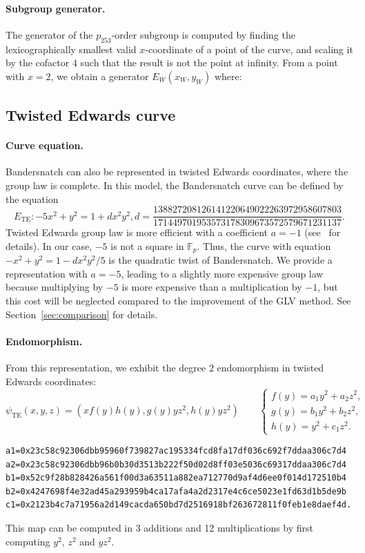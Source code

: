 \documentclass{article}
\newcommand{\Fp}{\ensuremath{\mathbb F_p}}
\theoremstyle{definition}
\begin{document}
\paragraph{Subgroup generator.}
The generator of the $p_{253}$-order subgroup is computed by finding the
lexicographically smallest valid $x$-coordinate of a point of the
curve, and scaling it by the cofactor $4$ such that the result is not
the point at infinity. From a point with $x=2$, we obtain a generator $E_W(x_W,y_W)$ where:


\subsection{Twisted Edwards curve}
\paragraph{Curve equation.}
Bandersnatch can also be represented in twisted Edwards coordinates,
where the group law is complete.
In this model, the Bandersnatch curve can be defined by the equation
$$E_\text{TE}:-5x^2+y^2 = 1 +
dx^2y^2, d=\frac{138827208126141220649022263972958607803}{171449701953573178309673572579671231137}.$$
Twisted Edwards group law is more efficient with a coefficient
$a = -1$ (see~\cite{AC:HWCD08} for details).
In our case, $-5$ is not a square in $\Fp$. Thus, the curve with
equation $-x^2+y^2 = 1 -dx^2y^2/5$ is the quadratic twist of
Bandersnatch. We provide a representation with $a=-5$, leading to a
slightly more expensive group law because multiplying by $-5$ is more
expensive than a multiplication by $-1$, but this cost will be
neglected compared to the improvement of the GLV method. See
Section~\ref{sec:comparison} for details.

\paragraph{Endomorphism.}
From this representation, we exhibit the degree $2$ endomorphism in
twisted Edwards coordinates:
$$
\psi_\text{TE}(x,y,z) = \left(xf(y)h(y), g(y)yz^2, h(y)yz^2\right)\qquad
\left\{\begin{array}{r}
f(y) = a_1y^2+a_2z^2,\\
g(y) = b_1y^2+b_2z^2,\\
h(y) = y^2+c_1z^2.
\end{array}\right.$$

\begin{verbatim}
a1=0x23c58c92306dbb95960f739827ac195334fcd8fa17df036c692f7ddaa306c7d4
a2=0x23c58c92306dbb96b0b30d3513b222f50d02d8ff03e5036c69317ddaa306c7d4
b1=0x52c9f28b828426a561f00d3a63511a882ea712770d9af4d6ee0f014d172510b4
b2=0x4247698f4e32ad45a293959b4ca17afa4a2d2317e4c6ce5023e1fd63d1b5de9b
c1=0x2123b4c7a71956a2d149cacda650bd7d2516918bf263672811f0feb1e8daef4d.
\end{verbatim}
This map can be computed in 3 additions and 12 multiplications by
first computing $y^2$, $z^2$ and $yz^2$.
\end{document}
